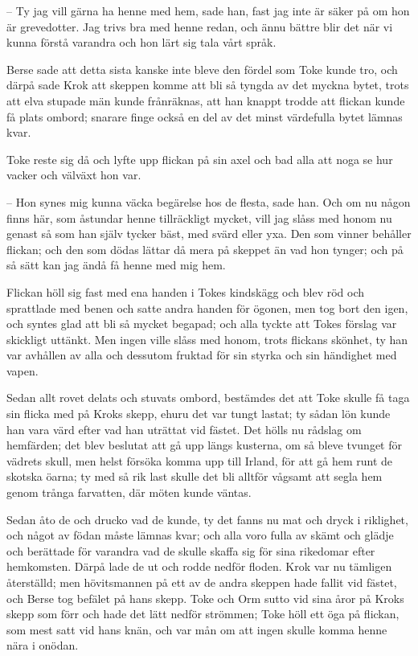– Ty jag vill gärna ha henne med hem, sade han, fast jag inte är säker på om hon är grevedotter. Jag trivs bra med henne redan, och ännu bättre blir det när vi kunna förstå varandra och hon lärt sig tala vårt språk.

\initial Berse sade att detta sista kanske inte bleve den fördel som Toke kunde tro, och därpå sade Krok att skeppen komme att bli så tyngda av det myckna bytet, trots att elva stupade män kunde frånräknas, att han knappt trodde att flickan kunde få plats ombord; snarare finge också en del av det minst värdefulla bytet lämnas kvar.

\initial Toke reste sig då och lyfte upp flickan på sin axel och bad alla att noga se hur vacker och välväxt hon var.

– Hon synes mig kunna väcka begärelse hos de flesta, sade han. Och om nu någon finns här, som åstundar henne tillräckligt mycket, vill jag slåss med honom nu genast så som han själv tycker bäst, med svärd eller yxa. Den som vinner behåller flickan; och den som dödas lättar då mera på skeppet än vad hon tynger; och på så sätt kan jag ändå få henne med mig hem.

\initial Flickan höll sig fast med ena handen i Tokes kindskägg och blev röd och sprattlade med benen och satte andra handen för ögonen, men tog bort den igen, och syntes glad att bli så mycket begapad; och alla tyckte att Tokes förslag var skickligt uttänkt. Men ingen ville slåss med honom, trots flickans skönhet, ty han var avhållen av alla och dessutom fruktad för sin styrka och sin händighet med vapen.

\initial Sedan allt rovet delats och stuvats ombord, bestämdes det att Toke skulle få taga sin flicka med på Kroks skepp, ehuru det var tungt lastat; ty sådan lön kunde han vara värd efter vad han uträttat vid fästet. Det hölls nu rådslag om hemfärden; det blev beslutat att gå upp längs kusterna, om så bleve tvunget för vädrets skull, men helst försöka komma upp till Irland, för att gå hem runt de skotska öarna; ty med så rik last skulle det bli alltför vågsamt att segla hem genom trånga farvatten, där möten kunde väntas.

\initial Sedan åto de och drucko vad de kunde, ty det fanns nu mat och dryck i riklighet, och något av födan måste lämnas kvar; och alla voro fulla av skämt och glädje och berättade för varandra vad de skulle skaffa sig för sina rikedomar efter hemkomsten. Därpå lade de ut och rodde nedför floden. Krok var nu tämligen återställd; men hövitsmannen på ett av de andra skeppen hade fallit vid fästet, och Berse tog befälet på hans skepp. Toke och Orm sutto vid sina åror på Kroks skepp som förr och hade det lätt nedför strömmen; Toke höll ett öga på flickan, som mest satt vid hans knän, och var mån om att ingen skulle komma henne nära i onödan.
